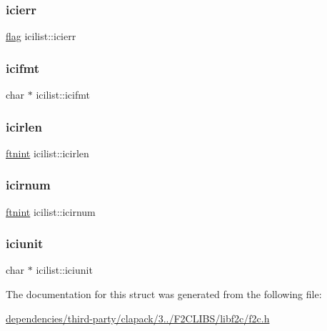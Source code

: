 \mbox{\label{structicilist_aee2f6c57bb6df08adfc9d62a185f999a}} 
\subsubsection{\texorpdfstring{icierr}{icierr}}
{\footnotesize\ttfamily \hyperlink{dependencies_2third-party_2clapack_23_82_81_2_f2_c_l_i_b_s_2libf2c_2f2c_8h_abf5d144da384425ae6cb542ce6eec8d3}{flag} icilist\+::icierr}

\mbox{\label{structicilist_a3cdb7459a29d1dc71e53c0b72d2f9b65}} 
\subsubsection{\texorpdfstring{icifmt}{icifmt}}
{\footnotesize\ttfamily char $\ast$ icilist\+::icifmt}

\mbox{\label{structicilist_ac6025ddf8b1ade5cb73d607dd2d30501}} 
\subsubsection{\texorpdfstring{icirlen}{icirlen}}
{\footnotesize\ttfamily \hyperlink{dependencies_2third-party_2clapack_23_82_81_2_f2_c_l_i_b_s_2libf2c_2f2c_8h_a9d70cdb573fb2bf020e1f6dba85fb1cc}{ftnint} icilist\+::icirlen}

\mbox{\label{structicilist_a6e4cb8719f1c76ee87273671448da892}} 
\subsubsection{\texorpdfstring{icirnum}{icirnum}}
{\footnotesize\ttfamily \hyperlink{dependencies_2third-party_2clapack_23_82_81_2_f2_c_l_i_b_s_2libf2c_2f2c_8h_a9d70cdb573fb2bf020e1f6dba85fb1cc}{ftnint} icilist\+::icirnum}

\mbox{\label{structicilist_aabde2b3e831e973dbcca0e8bd1d8b59b}} 
\subsubsection{\texorpdfstring{iciunit}{iciunit}}
{\footnotesize\ttfamily char $\ast$ icilist\+::iciunit}



The documentation for this struct was generated from the following file\+:\begin{DoxyCompactItemize}
\item 
\hyperlink{dependencies_2third-party_2clapack_23_82_81_2_f2_c_l_i_b_s_2libf2c_2f2c_8h}{dependencies/third-\/party/clapack/3../\+F2\+C\+L\+I\+B\+S/libf2c/f2c.\+h}\end{DoxyCompactItemize}
